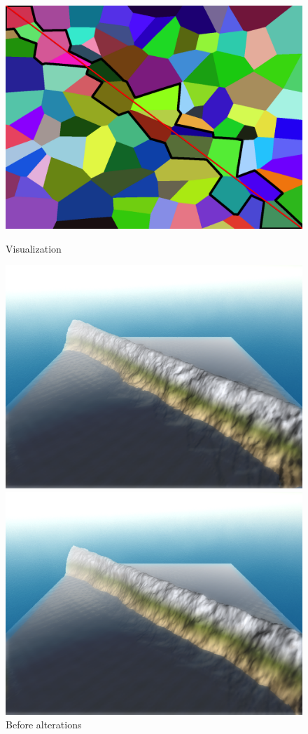\documentclass[11pt,a4paper,twoside,openright]{report}
\begin{document}
\begin{figure}[!htb]
  \includegraphics[width=\linewidth]{voronoi100-diagonal.png}
  \caption{Visualization}\label{fig:voronoi2diagonal}
\endminipage\hfill
{}
  \includegraphics[width=\linewidth]{mountain-range-normal.png}
  \caption{Before alterations}\label{fig:mountainrangenormal}
\endminipage\hfill
{}%
  \includegraphics[width=\linewidth]{mountain-range-alteration.png}

\end{figure}
\end{document}
